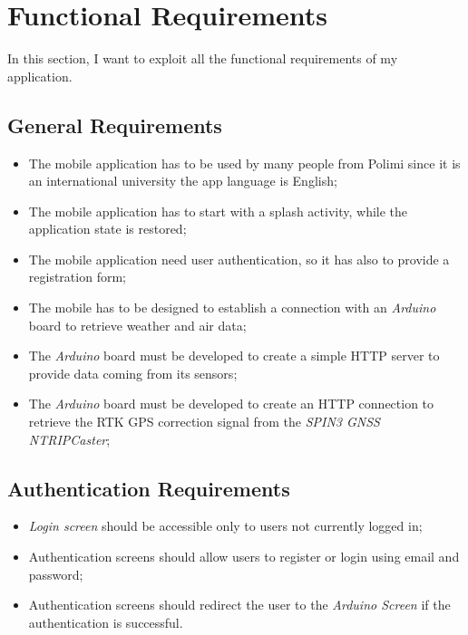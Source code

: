 \section{Functional Requirements}
In this section, I want to exploit all the functional requirements of my application.

\subsection{General Requirements}
\begin{itemize}
    \item The mobile application has to be used by many people from Polimi since it is an international university the app language is English;
    \item The mobile application has to start with a splash activity, while the application state is restored;
    \item The mobile application need user authentication, so it has also to provide a registration form;
    \item The mobile has to be designed to establish a connection with an \textit{Arduino} board to retrieve weather and air data;
    \item The \textit{Arduino} board must be developed to create a simple HTTP server to provide data coming from its sensors;
    \item The \textit{Arduino} board must be developed to create an HTTP connection to retrieve the RTK GPS correction signal from the \textit{SPIN3 GNSS NTRIPCaster};
\end{itemize}

\subsection{Authentication Requirements}
\begin{itemize}
    \item \textit{Login screen} should be accessible only to users not currently logged in;
    \item Authentication screens should allow users to register or login using email and password;
    \item Authentication screens should redirect the user to the \textit{Arduino Screen} if the authentication is successful.
\end{itemize}
    
